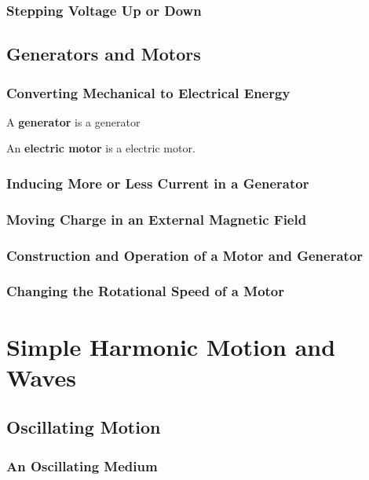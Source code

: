 \documentclass[dvipsnames]{article}
\newif\ifShowUnitXI                              %
\begin{document}
\subsubsection{Stepping Voltage Up or Down}

\subsection{Generators and Motors}

\subsubsection{Converting Mechanical to Electrical Energy}

A \textbf{\gls{generator}} is a \glsdesc{generator}

An \textbf{\gls{electric motor}} is a \glsdesc{electric motor}.

\subsubsection{Inducing More or Less Current in a Generator}

\subsubsection{Moving Charge in an External Magnetic Field}

\subsubsection{Construction and Operation of a Motor and Generator}

\subsubsection{Changing the Rotational Speed of a Motor}

\fi

\clearpage


\section{Simple Harmonic Motion and Waves}

\ifShowUnitXI
\subsection{Oscillating Motion}

\subsubsection{An Oscillating Medium}
\end{document}
